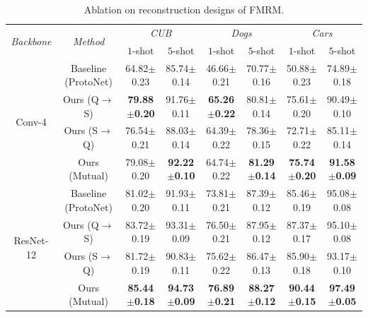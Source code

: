 \documentclass[letterpaper]{article} %
\begin{document}
\begin{table}[!htp]
\centering
\caption{Ablation on reconstruction designs of FMRM.}
\label{tab:4}
\begin{tabular}{cccccccc}
\toprule[1pt]

\multirow{2}{*}{\it{Backbone}}
& \multirow{2}{*}{\it{Method}}
& \multicolumn{2}{c}{\it{CUB}}
& \multicolumn{2}{c}{\it{Dogs}}
& \multicolumn{2}{c}{\it{Cars}} \\

&
& \multicolumn{1}{c}{$1$-shot}
& \multicolumn{1}{c}{$5$-shot}
& \multicolumn{1}{c}{$1$-shot}
& \multicolumn{1}{c}{$5$-shot}
& \multicolumn{1}{c}{$1$-shot}
& \multicolumn{1}{c}{$5$-shot} \\ \midrule

\multirow{4}{*}{Conv-4}
&
Baseline (ProtoNet)
& 64.82$\pm$0.23
& 85.74$\pm$0.14
& 46.66$\pm$0.21
& 70.77$\pm$0.16
& 50.88$\pm$0.23
& 74.89$\pm$0.18 \\

&
Ours (Q$\to$S)
& \textbf{79.88$\pm$0.20}
& 91.76$\pm$0.11
& \textbf{65.26$\pm$0.22}
& 80.81$\pm$0.14
& 75.61$\pm$0.20
& 90.49$\pm$0.10 \\

&
Ours (S$\to$Q)
& 76.54$\pm$0.21
& 88.03$\pm$0.14
& 64.39$\pm$0.22
& 78.36$\pm$0.15
& 72.71$\pm$0.22
& 85.11$\pm$0.14 \\

&
Ours (Mutual)
&  79.08$\pm$0.20
& \textbf{92.22$\pm$0.10}
&  64.74$\pm$0.22
& \textbf{81.29$\pm$0.14}
& \textbf{75.74$\pm$0.20}
& \textbf{91.58$\pm$0.09} \\ \midrule

\multirow{4}{*}{ResNet-12}
&
Baseline (ProtoNet)
& 81.02$\pm$0.20
& 91.93$\pm$0.11
& 73.81$\pm$0.21
& 87.39$\pm$0.12
& 85.46$\pm$0.19
& 95.08$\pm$0.08 \\

&
Ours (Q$\to$S)
& 83.72$\pm$0.19
& 93.31$\pm$0.09
& 76.50$\pm$0.21
& 87.95$\pm$0.12
& 87.37$\pm$0.17
& 95.10$\pm$0.08 \\

&
Ours (S$\to$Q)
& 81.72$\pm$0.19
& 90.83$\pm$0.11
& 75.62$\pm$0.22
& 86.47$\pm$0.13
& 85.90$\pm$0.18
& 93.17$\pm$0.10 \\

&
Ours (Mutual)
& \textbf{85.44$\pm$0.18}
& \textbf{94.73$\pm$0.09}
& \textbf{76.89$\pm$0.21}
& \textbf{88.27$\pm$0.12}
& \textbf{90.44$\pm$0.15}
& \textbf{97.49$\pm$0.05} \\ \bottomrule
\end{tabular}
\end{table}
\end{document}
